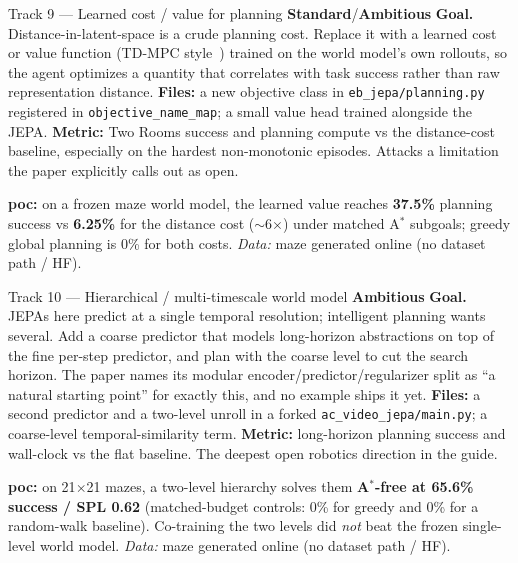 \documentclass{article}
\newcommand{\code}[1]{\texttt{\small #1}}
\newcommand{\file}[1]{\texttt{\small #1}}
\newcommand{\diffmed}{\colorbox{ebamber!18}{\textcolor{ebamber}{\small\bfseries Standard}}}
\newcommand{\diffhard}{\colorbox{ebred!15}{\textcolor{ebred}{\small\bfseries Ambitious}}}
\begin{document}
\begin{trackbox}{Track 9 --- Learned cost / value for planning \hfill \diffmed{}/\diffhard{}}
\textbf{Goal.} Distance-in-latent-space is a crude planning cost. Replace it with a
learned cost or value function (TD-MPC style~\citep{TDMPC2,TD-MPC}) trained on the
world model's own rollouts, so the agent optimizes a quantity that correlates with
task success rather than raw representation distance. \textbf{Files:} a new
objective class in \file{eb\_jepa/planning.py} registered in
\code{objective\_name\_map}; a small value head trained alongside the JEPA.
\textbf{Metric:} Two Rooms success and planning compute vs the distance-cost
baseline, especially on the hardest non-monotonic episodes. Attacks a limitation
the paper explicitly calls out as open.

\smallskip
\textbf{poc:} on a frozen maze world model, the learned value reaches \textbf{37.5\%}
planning success vs \textbf{6.25\%} for the distance cost ($\sim$6$\times$) under
matched A$^*$ subgoals; greedy global planning is 0\% for both costs.
\emph{Data:} maze generated online (no dataset path / HF).
\end{trackbox}

\begin{trackbox}{Track 10 --- Hierarchical / multi-timescale world model \hfill \diffhard{}}
\textbf{Goal.} JEPAs here predict at a single temporal resolution; intelligent
planning wants several. Add a coarse predictor that models long-horizon
abstractions on top of the fine per-step predictor, and plan with the coarse level
to cut the search horizon. The paper names its modular encoder/predictor/regularizer
split as ``a natural starting point'' for exactly this, and no example ships it yet.
\textbf{Files:} a second predictor and a two-level unroll in a forked
\code{ac\_video\_jepa/main.py}; a coarse-level temporal-similarity term.
\textbf{Metric:} long-horizon planning success and wall-clock vs the flat baseline.
The deepest open robotics direction in the guide.

\smallskip
\textbf{poc:} on 21$\times$21 mazes, a two-level hierarchy solves them
\textbf{A$^*$-free at 65.6\% success / SPL 0.62} (matched-budget controls: 0\% for
greedy and 0\% for a random-walk baseline). Co-training the two levels did
\emph{not} beat the frozen single-level world model.
\emph{Data:} maze generated online (no dataset path / HF).
\end{trackbox}
\end{document}

